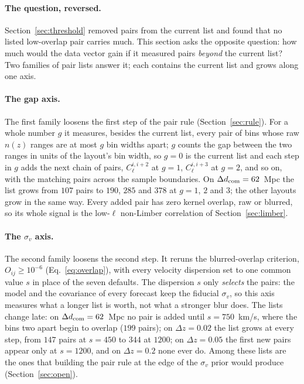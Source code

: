 \documentclass[11pt]{article}
\newcommand{\dcom}{$\Delta d_{\rm com} = 62$~Mpc}
\newcommand{\sv}{\sigma_v}
\begin{document}
\paragraph{The question, reversed.}
Section~\ref{sec:threshold} removed pairs from the current list and
found that no listed low-overlap pair carries much.  This section asks
the opposite question: how much would the data vector gain if it
measured pairs \emph{beyond} the current list?  Two families of pair
lists answer it; each contains the current list and grows along one
axis.

\paragraph{The gap axis.}
The first family loosens the first step of the pair rule
(Section~\ref{sec:rule}).  For a whole number $g$ it measures, besides
the current list, every pair of bins whose raw $n(z)$ ranges are at
most $g$ bin widths apart; $g$ counts the gap between the two ranges
in units of the layout's bin width, so $g = 0$ is the current list and
each step in $g$ adds the next chain of pairs, $C^{i,i+2}_\ell$ at
$g = 1$, $C^{i,i+3}_\ell$ at $g = 2$, and so on, with the matching
pairs across the sample boundaries.  On \dcom{} the list grows from
$107$ pairs to $190$, $285$ and $378$ at $g = 1$, $2$ and $3$; the
other layouts grow in the same way.  Every added pair has zero
kernel overlap, raw or blurred, so its whole signal is the
low-$\ell$ non-Limber correlation of Section~\ref{sec:limber}.

\paragraph{The $\sv$ axis.}
The second family loosens the second step.  It reruns the
blurred-overlap criterion, $O_{ij} \ge 10^{-6}$
(Eq.~\eqref{eq:overlap}), with every velocity dispersion set to one
common value $s$ in place of the seven defaults.  The dispersion $s$
only \emph{selects} the pairs: the model and the covariance of every
forecast keep the fiducial $\sv$, so this axis measures what a longer
list is worth, not what a stronger blur does.  The lists change late:
on \dcom{} no pair is added until $s = 750$~km/s, where the bins two
apart begin to overlap ($199$ pairs); on $\Delta z = 0.02$ the list
grows at every step, from $147$ pairs at $s = 450$ to $344$ at
$1200$; on $\Delta z = 0.05$ the first new pairs appear only at
$s = 1200$, and on $\Delta z = 0.2$ none ever do.  Among these lists
are the ones that building the pair rule at the edge of the $\sv$
prior would produce (Section~\ref{sec:open}).
\end{document}
